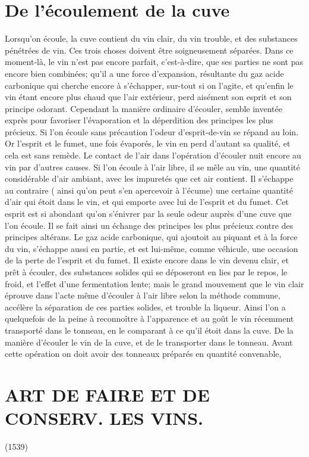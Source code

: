 \section{De l'écoulement de la cuve}
Lorsqu'on écoule, la cuve contient du\setcounter{page}{152} vin clair, du vin trouble, et des substances pénétrées de vin. Ces trois choses doivent être soigneusement séparées.
Dans ce moment-là, le vin n'est pas encore parfait, c'est-à-dire, que ses parties ne sont pas encore bien combinées; qu'il a une force d'expansion, résultante du gaz acide carbonique qui cherche encore à s'échapper, sur-tout si on l'agite, et qu'enfin le vin étant encore plus chaud que l'air extérieur, perd aisément son esprit et son principe odorant.
Cependant la manière ordinaire d'écouler, semble inventée exprès pour favoriser l'évaporation et la déperdition des principes les plus précieux. Si l'on écoule sans précaution l'odeur d'esprit-de-vin se répand au loin. Or l'esprit et le fumet, une fois évaporés, le vin en perd d'autant sa qualité, et cela est sans remède. Le contact de l'air dans l'opération d'écouler nuit encore au vin par d'autres causes.
Si l'on écoule à l'air libre, il se mêle au vin, une quantité considérable d'air ambiant, avec les impuretés que cet air contient. Il s'échappe au contraire ( ainsi qu'on peut s'en apercevoir à l'écume) une certaine quantité d'air qui étoit dans le vin,\setcounter{page}{153} et qui emporte avec lui de l'esprit et du fumet. Cet esprit est si abondant qu'on s'énivrer par la seule odeur auprès d'une cuve que l'on écoule. Il se fait ainsi un échange des principes les plus précieux contre des principes altérans. Le gaz acide carbonique, qui ajoutoit au piquant et à la force du vin, s'échappe aussi en partie, et est lui-même, comme véhicule, une occasion de la perte de l'esprit et du fumet.
Il existe encore dans le vin devenu clair, et prêt à écouler, des substances solides qui se déposeront en lies par le repos, le froid, et l'effet d'une fermentation lente; mais le grand mouvement que le vin clair éprouve dans l'acte même d'écouler à l'air libre selon la méthode commune, accélère la séparation de ces parties solides, et trouble la liqueur. Ainsi l'on a quelquefois de la peine à reconnoître à l'apparence et au goût le vin récemment transporté dans le tonneau, en le comparant à ce qu'il étoit dans la cuve.
De la manière d'écouler le vin de la cuve, et de le transporter dans le tonneau.
Avant cette opération on doit avoir des tonneaux préparés en quantité convenable,\setcounter{page}{154} \section{ART DE FAIRE ET DE CONSERV. LES VINS.} (1539)
